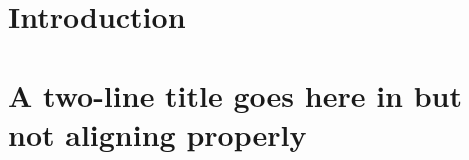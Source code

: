 \documentclass{memoir}
\newif\ifNoChapNumber
\renewcommand\chapnumfont{\Large\sffamily}
\renewcommand\chaptitlefont{\huge\bfseries\sffamily}
\renewcommand\printchaptertitle[1]{%
        \vspace*{-26.4em}{\texttt{[image: ../chap.pdf]}};
        \begin{tikzpicture}%
        \end{tikzpicture}
        
        \ifNoChapNumber{ %
            \vspace*{-26.4em}\hspace*{3.4em}%
            \chaptitlefont\textcolor{purple}{##1} %
            \vspace*{2em}
        }
        \else{ %
            \vspace*{-9em}\hspace*{3.2em}%
            \chapnumfont\textcolor{red}{Chapter \thechapter} %
            
            \vspace*{0.5em}\hspace*{2.3em}%
            \chaptitlefont\textcolor{purple}{ ##1} %
            \vspace*{2em}
        }
        \fi
        \NoChapNumberfalse
    }
\let\chaptercopy\chapter %
\newcommand\chapterLongerTitle[1]{\chaptercopy{#1}}{%
    \renewcommand\printchaptertitle[1]{%
        \begin{tikzpicture}[scale=1.7]
            \fill[yellow] (0,0) rectangle (0.5,0.5);  %
            \fill[yellow] (0,2) rectangle (0.5,1.5);  %
            \fill[blue] (1,-0.5) rectangle (0.5,0);    %
            \fill[blue] (1,2.5) rectangle (0.5,2);     %
        \end{tikzpicture}
        \vspace*{-9em}\hspace*{3.2em}%
        \chapnumfont\textcolor{red}{Chapter \thechapter} %
        \vspace*{0.5em}\hspace*{2.3em}%
        \chaptitlefont\textcolor{purple}{ #1} %
        \vspace*{2em}
    }
}
\begin{document}
   \chapter*{Introduction}
   \chapterLongerTitle{A two-line title goes here in but not aligning properly}
\end{document}
